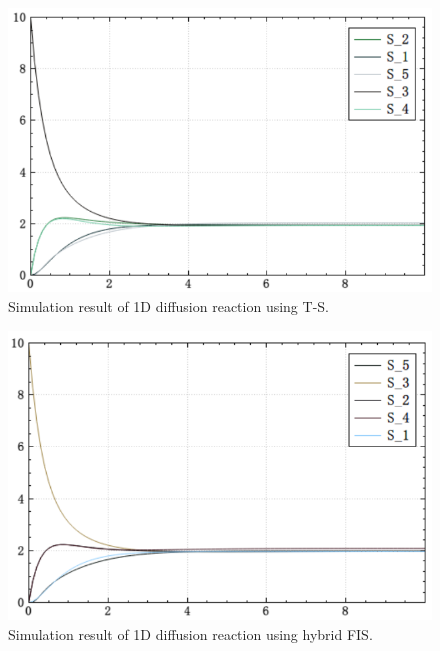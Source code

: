 \documentclass[journal,a4paper,onecolumn]{article}
\begin{document}
\begin{figure}[!hbt]
	\begin{center}
		\includegraphics[width=\columnwidth]{fig23}
		\caption{Simulation result of 1D diffusion reaction using T-S.}
		\label{fig:Simulation result of 1D diffusion reaction using T-S.}
	\end{center}
\end{figure}

\begin{figure}[!hbt]
	\begin{center}
		\includegraphics[width=\columnwidth]{fig24}
		\caption{Simulation result of 1D diffusion reaction using hybrid FIS.}
		\label{fig:Simulation result of 1D diffusion reaction using hybrid FIS.}
	\end{center}
\end{figure}
\end{document}
